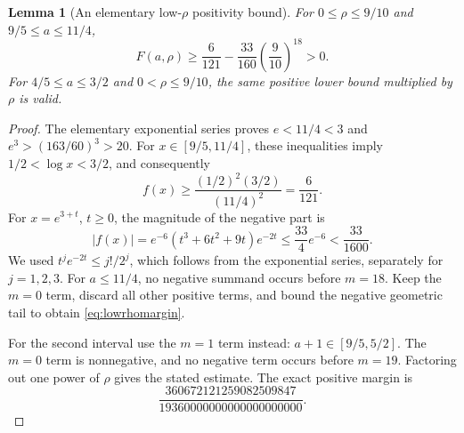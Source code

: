\documentclass[11pt]{article}
\numberwithin{equation}{section}
\newtheorem{lemma}[lemma]{Lemma}
\theoremstyle{definition}
\begin{document}
\begin{lemma}[An elementary low-$\rho$ positivity bound]\label{lem:lowrho}
For $0\leq\rho\leq9/10$ and $9/5\leq a\leq11/4$,
\begin{equation}\label{eq:lowrhomargin}
 F(a,\rho)\geq \frac6{121}-\frac{33}{160}\left(\frac9{10}\right)^{18}>0.
\end{equation}
For $4/5\leq a\leq3/2$ and $0<\rho\leq9/10$, the same positive lower
bound multiplied by $\rho$ is valid.
\end{lemma}
\begin{proof}
The elementary exponential series proves $e<11/4<3$ and
$e^3>(163/60)^3>20$. For $x\in[9/5,11/4]$, these inequalities imply
$1/2<\log x<3/2$, and consequently
\[
 f(x)\geq\frac{(1/2)^2(3/2)}{(11/4)^2}=\frac6{121}.
\]
For $x=e^{3+t}$, $t\geq0$, the magnitude of the negative part is
\[
 |f(x)|=e^{-6}(t^3+6t^2+9t)e^{-2t}
 \leq\frac{33}{4}e^{-6}<\frac{33}{1600}.
\]
We used $t^j e^{-2t}\leq j!/2^j$, which follows from the exponential
series, separately for $j=1,2,3$.
For $a\leq11/4$, no negative summand occurs before $m=18$.
Keep the $m=0$ term, discard all other positive terms, and bound the
negative geometric tail to obtain \eqref{eq:lowrhomargin}.

For the second interval use the $m=1$ term instead: $a+1\in[9/5,5/2]$.
The $m=0$ term is nonnegative, and no negative term occurs before $m=19$.
Factoring out one power of $\rho$ gives the stated estimate. The exact
positive margin is
\[
 \frac{360672121259082509847}{19360000000000000000000}.
\]
\end{proof}
\end{document}
